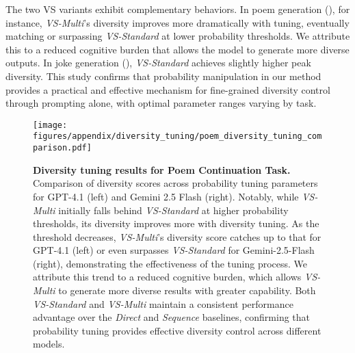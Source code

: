 The two VS variants exhibit complementary behaviors. In poem generation (), for instance, \emph{VS-Multi}'s diversity improves more dramatically with tuning, eventually matching or surpassing \emph{VS-Standard} at lower probability thresholds. We attribute this to a reduced cognitive burden that allows the model to generate more diverse outputs. In joke generation (), \emph{VS-Standard} achieves slightly higher peak diversity. This study confirms that probability manipulation in our method provides a practical and effective mechanism for fine-grained diversity control through prompting alone, with optimal parameter ranges varying by task.



\begin{figure}
    \centering
    \texttt{[image: figures/appendix/diversity\_tuning/poem\_diversity\_tuning\_comparison.pdf]}
    \caption{
    \textbf{Diversity tuning results for Poem Continuation Task.}
    Comparison of diversity scores across probability
  tuning parameters for GPT-4.1 (left) and Gemini 2.5 Flash
  (right). Notably, while \emph{VS-Multi} initially falls behind \emph{VS-Standard} at higher probability thresholds, its diversity improves more with diversity tuning. As the threshold decreases, \emph{VS-Multi}'s diversity score catches up to that for GPT-4.1 (left) or even surpasses \emph{VS-Standard} for Gemini-2.5-Flash (right), demonstrating the effectiveness of the tuning process. We attribute this trend to a reduced cognitive burden, which allows \emph{VS-Multi} to generate more diverse results with greater capability. Both \emph{VS-Standard} and \emph{VS-Multi} maintain a consistent performance advantage over the \emph{Direct} and \emph{Sequence} baselines, confirming that probability tuning provides effective diversity control across different models.
    }
    \label{fig:diversity_tuning_poem}
\end{figure}

